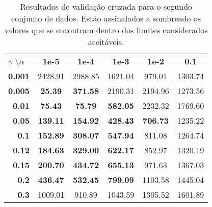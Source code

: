 \begin{table}[ht]
\footnotesize
\centering
\begin{tabular}{|rccccc|}
\hline
\multicolumn{1}{|l}{$\gamma$ \textbackslash $\alpha$} & \textbf{1e-5}                           & \textbf{1e-4}                           & \textbf{1e-3}                           & \textbf{1e-2}                           & \textbf{0.1} \\ \cline{2-6} 
\multicolumn{1}{|r|}{\textbf{0.001}}                  & 2428.91                                 & 2988.85                                 & 1621.04                                 & 979.01                                  & 1303.74      \\
\multicolumn{1}{|r|}{\textbf{0.005}}                  & \cellcolor[HTML]{EFEFEF}\textbf{25.39}  & \cellcolor[HTML]{EFEFEF}\textbf{371.58} & 2190.31                                 & 2194.96                                 & 1273.56      \\
\multicolumn{1}{|r|}{\textbf{0.01}}                   & \cellcolor[HTML]{EFEFEF}\textbf{75.43}  & \cellcolor[HTML]{EFEFEF}\textbf{75.79}  & \cellcolor[HTML]{EFEFEF}\textbf{582.05} & 2232.32                                 & 1769.60      \\
\multicolumn{1}{|r|}{\textbf{0.05}}                   & \cellcolor[HTML]{EFEFEF}\textbf{139.11} & \cellcolor[HTML]{EFEFEF}\textbf{154.92} & \cellcolor[HTML]{EFEFEF}\textbf{428.43} & \cellcolor[HTML]{EFEFEF}\textbf{706.73} & 1235.22      \\
\multicolumn{1}{|r|}{\textbf{0.1}}                    & \cellcolor[HTML]{EFEFEF}\textbf{152.89} & \cellcolor[HTML]{EFEFEF}\textbf{308.07} & \cellcolor[HTML]{EFEFEF}\textbf{547.94} & 811.08                                  & 1264.74      \\
\multicolumn{1}{|r|}{\textbf{0.12}}                   & \cellcolor[HTML]{EFEFEF}\textbf{184.63} & \cellcolor[HTML]{EFEFEF}\textbf{329.00} & \cellcolor[HTML]{EFEFEF}\textbf{622.17} & 852.97                                  & 1320.19      \\
\multicolumn{1}{|r|}{\textbf{0.15}}                   & \cellcolor[HTML]{EFEFEF}\textbf{200.70} & \cellcolor[HTML]{EFEFEF}\textbf{434.72} & \cellcolor[HTML]{EFEFEF}\textbf{655.13} & 971.63                                  & 1367.03      \\
\multicolumn{1}{|r|}{\textbf{0.2}}                    & \cellcolor[HTML]{EFEFEF}\textbf{436.47} & \cellcolor[HTML]{EFEFEF}\textbf{532.45} & \cellcolor[HTML]{EFEFEF}\textbf{799.09} & 1103.58                                 & 1445.04      \\
\multicolumn{1}{|r|}{\textbf{0.3}}                    & 1009.01                                 & 910.89                                  & 1043.59                                 & 1305.52                                 & 1601.89      \\ \hline
\end{tabular}
\caption{\footnotesize Resultados de validação cruzada para o segundo conjunto de dados. Estão assinalados a sombreado os valores que se encontram dentro dos limites considerados aceitáveis.}
\end{table}